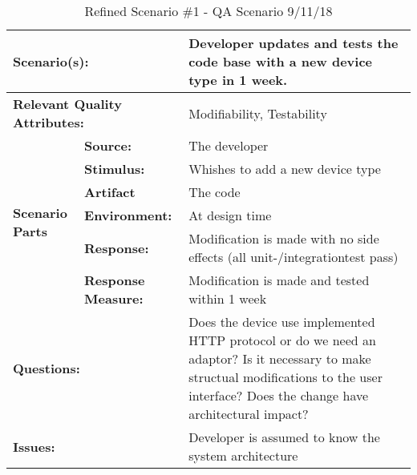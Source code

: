 \documentclass[a4paper,10pt]{article}
\begin{document}
\begin{table}[!htp]
\begin{center}
\begin{tabular}{|p{0.3cm}|p{2.5cm}|p{8cm}|}
  \hline
  \multicolumn{2}{|p{3cm}|}{\bfseries Scenario(s):} & Developer updates and tests the code base with a new device type in 1 week. \\
  \hline
  \multicolumn{2}{|p{3cm}|}{\bfseries Relevant Quality Attributes:} & Modifiability, Testability  \\
  \hline
  \multirow{6}{*}{\begin{sideways}{\bfseries Scenario Parts}\end{sideways}}
  & {\bfseries Source:} & The developer \\
  \cline{2-3}
  & {\bfseries Stimulus:} & Whishes to add a new device type \\
  \cline{2-3}
  & {\bfseries Artifact} & The code \\
  \cline{2-3}
  & {\bfseries Environment:} & At design time \\
  \cline{2-3}
  & {\bfseries Response:} & Modification is made with no side effects (all unit-/integrationtest pass)\\
  \cline{2-3}
  & {\bfseries Response \mbox{Measure:}} & Modification is made and tested within 1 week \\
  \hline
  \multicolumn{2}{|p{3cm}|}{\bfseries Questions:} & Does the device use implemented HTTP protocol or do we need an adaptor? Is it necessary to make structual modifications to the user interface? Does the change have architectural impact? \\
  \hline
  \multicolumn{2}{|p{3cm}|}{\bfseries Issues:} & Developer is assumed to know the system architecture  \\
  \hline
\end{tabular}
\caption{Refined Scenario \#1 - QA Scenario 9/11/18}
\end{center}
\end{table}
\end{document}

